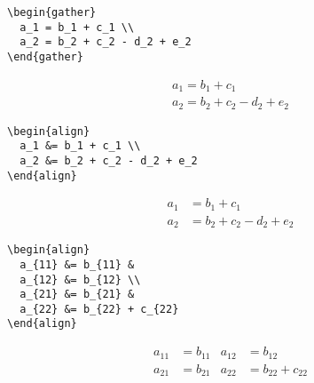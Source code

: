 \begin{table}[p]
  \begin{eqxample}
\begin{lstlisting}
\begin{gather}
  a_1 = b_1 + c_1 \\
  a_2 = b_2 + c_2 - d_2 + e_2
\end{gather}
\end{lstlisting}
    \producing
    \begin{gather}
      a_1=b_1+c_1\\
      a_2=b_2+c_2-d_2+e_2
    \end{gather}
  \end{eqxample}

  \begin{eqxample}
\begin{lstlisting}
\begin{align}
  a_1 &= b_1 + c_1 \\
  a_2 &= b_2 + c_2 - d_2 + e_2
\end{align}
\end{lstlisting}
    \producing
    \begin{align}
      a_1& =b_1+c_1\\
      a_2& =b_2+c_2-d_2+e_2
    \end{align}
  \end{eqxample}

  \begin{eqxample}
\begin{lstlisting}
\begin{align}
  a_{11} &= b_{11} &
  a_{12} &= b_{12} \\
  a_{21} &= b_{21} &
  a_{22} &= b_{22} + c_{22}
\end{align}
\end{lstlisting}
    \producing
    \begin{align}
      a_{11}& =b_{11}&
      a_{12}& =b_{12}\\
      a_{21}& =b_{21}&
      a_{22}& =b_{22}+c_{22}
    \end{align}
  \end{eqxample}
\end{table}

